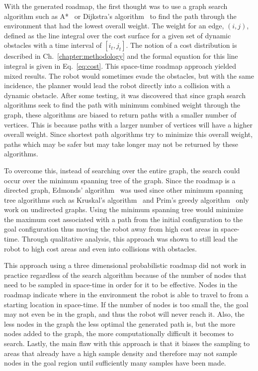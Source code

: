 With the generated roadmap, the first thought was to use a graph search
algorithm such as A*~\cite{astar} or Dijkstra's algorithm~\cite{dijkstra} to
find the path through the environment that had the lowest overall weight.  The
weight for an edge, $(i, j)$, defined as the line integral over the cost
surface for a given set of dynamic obstacles with a time interval of $[i_t,
j_t]$.  The notion of a cost distribution is described in
Ch.~\ref{chapter:methodology} and the formal equation for this line integral is
given in Eq.~\ref{eq:cost}.  This space-time roadmap approach yielded mixed
results.  The robot would sometimes evade the obstacles, but with the same
incidence, the planner would lead the robot directly into a collision with a
dynamic obstacle. After some testing, it was discovered that since graph search
algorithms seek to find the path with minimum combined weight through the
graph, these algorithms are biased to return paths with a smaller number of
vertices.  This is because paths with a larger number of vertices will have a
higher overall weight. Since shortest path algorithms try to minimize this
overall weight, paths which may be safer but may take longer may not be
returned by these algorithms.

To overcome this, instead of searching over the entire graph, the search could
occur over the minimum spanning tree of the graph.  Since the roadmap is a
directed graph, Edmonds' algorithm~\cite{edmonds} was used since other minimum
spanning tree algorithms such as Kruskal's algorithm~\cite{kruskal} and Prim's
greedy algorithm~\cite{prim} only work on undirected graphs. Using the minimum
spanning tree would minimize the maximum cost associated with a path from the
initial configuration to the goal configuration thus moving the robot away from
high cost areas in space-time. Through qualitative analysis, this approach was
shown to still lead the robot to high cost areas and even into collisions with
obstacles.

This approach using a three dimensional probabilistic roadmap did not work in
practice regardless of the search algorithm because of the number of nodes that
need to be sampled in space-time in order for it to be effective.  Nodes in the
roadmap indicate where in the environment the robot is able to travel to from a
starting location in space-time. If the number of nodes is too small the, the
goal may not even be in the graph, and thus the robot will never reach it.
Also, the less nodes in the graph the less optimal the generated path is, but
the more nodes added to the graph, the more computationally difficult it
becomes to search. Lastly, the main flaw with this approach is that it biases
the sampling to areas that already have a high sample density and therefore may
not sample nodes in the goal region until sufficiently many samples have been
made.

